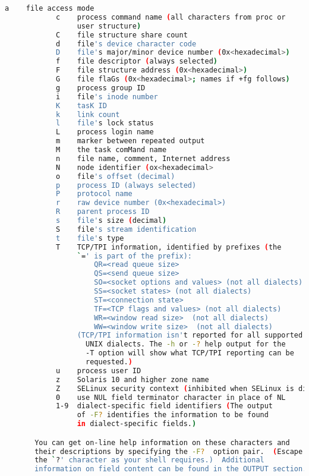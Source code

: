 {{\begin{lstlisting}[language=bash]
            a    file access mode
            c    process command name (all characters from proc or
                 user structure)
            C    file structure share count
            d    file's device character code
            D    file's major/minor device number (0x<hexadecimal>)
            f    file descriptor (always selected)
            F    file structure address (0x<hexadecimal>)
            G    file flaGs (0x<hexadecimal>; names if +fg follows)
            g    process group ID
            i    file's inode number
            K    tasK ID
            k    link count
            l    file's lock status
            L    process login name
            m    marker between repeated output
            M    the task comMand name
            n    file name, comment, Internet address
            N    node identifier (ox<hexadecimal>
            o    file's offset (decimal)
            p    process ID (always selected)
            P    protocol name
            r    raw device number (0x<hexadecimal>)
            R    parent process ID
            s    file's size (decimal)
            S    file's stream identification
            t    file's type
            T    TCP/TPI information, identified by prefixes (the
                 `=' is part of the prefix):
                     QR=<read queue size>
                     QS=<send queue size>
                     SO=<socket options and values> (not all dialects)
                     SS=<socket states> (not all dialects)
                     ST=<connection state>
                     TF=<TCP flags and values> (not all dialects)
                     WR=<window read size>  (not all dialects)
                     WW=<window write size>  (not all dialects)
                 (TCP/TPI information isn't reported for all supported
                   UNIX dialects. The -h or -? help output for the
                   -T option will show what TCP/TPI reporting can be
                   requested.)
            u    process user ID
            z    Solaris 10 and higher zone name
            Z    SELinux security context (inhibited when SELinux is disabled)
            0    use NUL field terminator character in place of NL
            1-9  dialect-specific field identifiers (The output
                 of -F? identifies the information to be found
                 in dialect-specific fields.)

       You can get on-line help information on these characters and
       their descriptions by specifying the -F?  option pair.  (Escape
       the `?' character as your shell requires.)  Additional
       information on field content can be found in the OUTPUT section.


\end{lstlisting}}}
